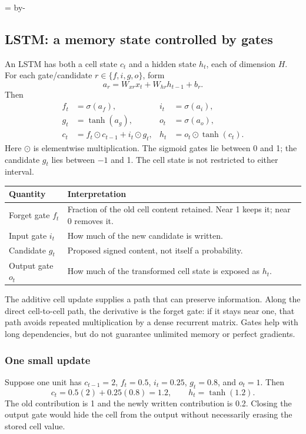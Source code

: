 \documentclass[11pt]{article}
\newcommand{\newsubsection}[1]{\par\begingroup\skip0=\pagegoal\advance\skip0 by-\pagetotal\ifdim\skip0<12\baselineskip\newpage\fi\endgroup\subsection{#1}}
\begin{document}
\newsubsection{LSTM: a memory state controlled by gates}
An LSTM has both a cell state $c_t$ and a hidden state $h_t$, each of dimension $H$. For each gate/candidate $r\in\{f,i,g,o\}$, form
\[
a_r=W_{xr}x_t+W_{hr}h_{t-1}+b_r.
\]
Then
\[
\begin{aligned}
f_t&=\sigma(a_f), & i_t&=\sigma(a_i),\\
g_t&=\tanh(a_g), & o_t&=\sigma(a_o),\\
c_t&=f_t\odot c_{t-1}+i_t\odot g_t,&
h_t&=o_t\odot\tanh(c_t).
\end{aligned}
\]
Here $\odot$ is elementwise multiplication. The sigmoid gates lie between 0 and 1; the candidate $g_t$ lies between $-1$ and 1. The cell state is not restricted to either interval.

\begin{longtable}{@{}P{.21\textwidth}P{.69\textwidth}@{}}
\toprule Quantity & Interpretation\\\midrule\endhead
Forget gate $f_t$ & Fraction of the old cell content retained. Near 1 keeps it; near 0 removes it.\\
Input gate $i_t$ & How much of the new candidate is written.\\
Candidate $g_t$ & Proposed signed content, not itself a probability.\\
Output gate $o_t$ & How much of the transformed cell state is exposed as $h_t$.\\\bottomrule
\end{longtable}
The additive cell update supplies a path that can preserve information. Along the direct cell-to-cell path, the derivative is the forget gate: if it stays near one, that path avoids repeated multiplication by a dense recurrent matrix. Gates help with long dependencies, but do not guarantee unlimited memory or perfect gradients.

\subsubsection{One small update}
Suppose one unit has $c_{t-1}=2$, $f_t=0.5$, $i_t=0.25$, $g_t=0.8$, and $o_t=1$. Then
\[
c_t=0.5(2)+0.25(0.8)=1.2,\qquad h_t=\tanh(1.2).
\]
The old contribution is 1 and the newly written contribution is 0.2. Closing the output gate would hide the cell from the output without necessarily erasing the stored cell value.
\end{document}
